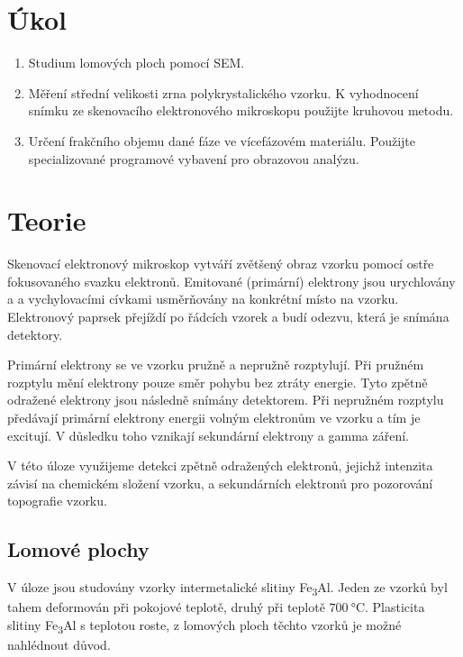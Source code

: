 \documentclass{protokol}
\begin{document}
  \section*{Úkol}

    \begin{enumerate}
      \item Studium lomových ploch pomocí SEM.
      \item Měření střední velikosti zrna polykrystalického vzorku. K vyhodnocení snímku ze skenovacího elektronového mikroskopu použijte kruhovou metodu.
      \item Určení frakčního objemu dané fáze ve vícefázovém materiálu. Použijte specializované programové vybavení pro obrazovou analýzu.
    \end{enumerate}

  \section*{Teorie}

    Skenovací elektronový mikroskop vytváří zvětšený obraz vzorku pomocí ostře fokusovaného svazku elektronů. Emitované (primární) elektrony jsou urychlovány a a vychylovacími cívkami usměrňovány na konkrétní místo na vzorku. Elektronový paprsek přejíždí po řádcích vzorek a budí odezvu, která je snímána detektory.

    Primární elektrony se ve vzorku pružně a nepružně rozptylují. Při pružném rozptylu mění elektrony pouze směr pohybu bez ztráty energie. Tyto zpětně odražené elektrony jsou následně snímány detektorem. Při nepružném rozptylu předávají primární elektrony energii volným elektronům ve vzorku a tím je excitují. V důsledku toho vznikají sekundární elektrony a gamma záření. 

    V této úloze využijeme detekci zpětně odražených elektronů, jejichž intenzita závisí na chemickém složení vzorku, a sekundárních elektronů pro pozorování topografie vzorku.

    \subsection*{Lomové plochy}

      V úloze jsou studovány vzorky intermetalické slitiny Fe\textsubscript{3}Al. Jeden ze vzorků byl tahem deformován při pokojové teplotě, druhý při teplotě $\SI{700}{\celsius}$. Plasticita slitiny Fe\textsubscript{3}Al s teplotou roste, z lomových ploch těchto vzorků je možné nahlédnout důvod.
\end{document}
